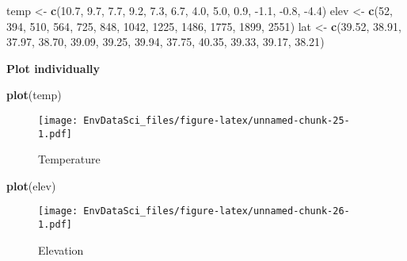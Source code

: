 \documentclass[
]{book}
\newenvironment{Shaded}{\begin{snugshade}}{\end{snugshade}}
\newcommand{\DecValTok}[1]{\textcolor[rgb]{0.00,0.00,0.81}{#1}}
\newcommand{\FloatTok}[1]{\textcolor[rgb]{0.00,0.00,0.81}{#1}}
\newcommand{\KeywordTok}[1]{\textcolor[rgb]{0.13,0.29,0.53}{\textbf{#1}}}
\newcommand{\NormalTok}[1]{#1}
\newcommand{\StringTok}[1]{\textcolor[rgb]{0.31,0.60,0.02}{#1}}
\begin{document}
\begin{Shaded}
\begin{Highlighting}[]
\NormalTok{temp <-}\StringTok{ }\KeywordTok{c}\NormalTok{(}\FloatTok{10.7}\NormalTok{, }\FloatTok{9.7}\NormalTok{, }\FloatTok{7.7}\NormalTok{, }\FloatTok{9.2}\NormalTok{, }\FloatTok{7.3}\NormalTok{, }\FloatTok{6.7}\NormalTok{, }\FloatTok{4.0}\NormalTok{, }\FloatTok{5.0}\NormalTok{, }\FloatTok{0.9}\NormalTok{, }\FloatTok{-1.1}\NormalTok{, }\FloatTok{-0.8}\NormalTok{, }\FloatTok{-4.4}\NormalTok{)}
\NormalTok{elev <-}\StringTok{ }\KeywordTok{c}\NormalTok{(}\DecValTok{52}\NormalTok{, }\DecValTok{394}\NormalTok{, }\DecValTok{510}\NormalTok{, }\DecValTok{564}\NormalTok{, }\DecValTok{725}\NormalTok{, }\DecValTok{848}\NormalTok{, }\DecValTok{1042}\NormalTok{, }\DecValTok{1225}\NormalTok{, }\DecValTok{1486}\NormalTok{, }\DecValTok{1775}\NormalTok{, }\DecValTok{1899}\NormalTok{, }\DecValTok{2551}\NormalTok{)}
\NormalTok{lat <-}\StringTok{ }\KeywordTok{c}\NormalTok{(}\FloatTok{39.52}\NormalTok{, }\FloatTok{38.91}\NormalTok{, }\FloatTok{37.97}\NormalTok{, }\FloatTok{38.70}\NormalTok{, }\FloatTok{39.09}\NormalTok{, }\FloatTok{39.25}\NormalTok{, }\FloatTok{39.94}\NormalTok{, }\FloatTok{37.75}\NormalTok{, }\FloatTok{40.35}\NormalTok{, }\FloatTok{39.33}\NormalTok{, }\FloatTok{39.17}\NormalTok{, }\FloatTok{38.21}\NormalTok{)}
\end{Highlighting}
\end{Shaded}

\textbf{Plot individually}

\begin{Shaded}
\begin{Highlighting}[]
\KeywordTok{plot}\NormalTok{(temp)}
\end{Highlighting}
\end{Shaded}

\begin{figure}
\centering
\texttt{[image: EnvDataSci\_files/figure-latex/unnamed-chunk-25-1.pdf]}
\caption{\label{fig:unnamed-chunk-25}Temperature}
\end{figure}

\begin{Shaded}
\begin{Highlighting}[]
\KeywordTok{plot}\NormalTok{(elev)}
\end{Highlighting}
\end{Shaded}

\begin{figure}
\centering
\texttt{[image: EnvDataSci\_files/figure-latex/unnamed-chunk-26-1.pdf]}
\caption{\label{fig:unnamed-chunk-26}Elevation}
\end{figure}
\end{document}
